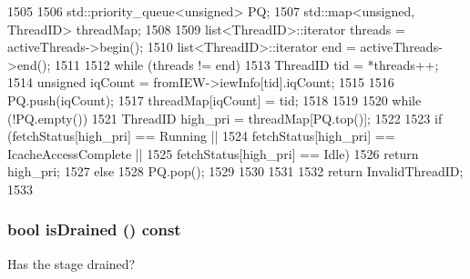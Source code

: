 \begin{DoxyCode}
1505 {
1506     std::priority_queue<unsigned> PQ;
1507     std::map<unsigned, ThreadID> threadMap;
1508 
1509     list<ThreadID>::iterator threads = activeThreads->begin();
1510     list<ThreadID>::iterator end = activeThreads->end();
1511 
1512     while (threads != end) {
1513         ThreadID tid = *threads++;
1514         unsigned iqCount = fromIEW->iewInfo[tid].iqCount;
1515 
1516         PQ.push(iqCount);
1517         threadMap[iqCount] = tid;
1518     }
1519 
1520     while (!PQ.empty()) {
1521         ThreadID high_pri = threadMap[PQ.top()];
1522 
1523         if (fetchStatus[high_pri] == Running ||
1524             fetchStatus[high_pri] == IcacheAccessComplete ||
1525             fetchStatus[high_pri] == Idle)
1526             return high_pri;
1527         else
1528             PQ.pop();
1529 
1530     }
1531 
1532     return InvalidThreadID;
1533 }
\end{DoxyCode}
\hypertarget{classDefaultFetch_adf5473c18a3d7c1e88c4a2072bce5526}{
\subsubsection[{isDrained}]{\setlength{\rightskip}{0pt plus 5cm}bool isDrained () const}}
\label{classDefaultFetch_adf5473c18a3d7c1e88c4a2072bce5526}
Has the stage drained? 


